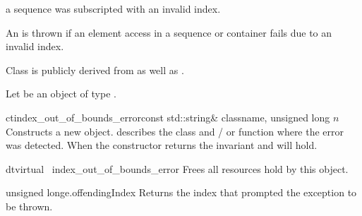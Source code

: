 


\NAME

 \dotfill a sequence was subscripted with an
invalid index.



\ABSTRACT

An  is thrown if an element access in a
sequence or container fails due to an invalid index.

\DESCRIPTION

Class  is publicly derived from
 as well as . 

Let  be an object of type . 


\CONS

\begin{fcode}{ct}{index_out_of_bounds_error}{const std::string& classname, 
    unsigned long $n$}
  Constructs a new  object. 
  describes the class and / or function where the error was detected.
  When the constructor returns the invariant  and  will hold.
\end{fcode}

\begin{fcode}{dt}{virtual ~index_out_of_bounds_error}{}
  Frees all resources hold by this object.
\end{fcode}


\ACCS

\begin{cfcode}{unsigned long}{e.offendingIndex}{}
  Returns the index that prompted the exception to be thrown.
\end{cfcode}

